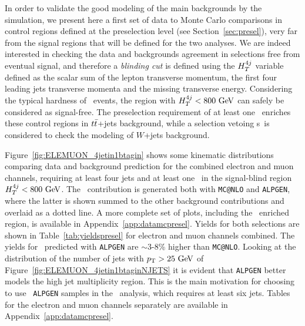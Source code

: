 
In order to validate the good modeling of the main backgrounds
by the simulation, we
present here a first set of data to Monte Carlo comparisons in
control regions defined at the preselection level 
(see Section~\ref{sec:presel}), very far from the
signal regions that will be defined for the two analyses. We
are indeed interested in checking the data and backgrounds agreement
in selections free from eventual signal, and therefore a {\it blinding cut}
is defined using the $\htfj$ variable defined as the scalar sum of the
lepton transverse momentum, the first four leading jets transverse momenta
and the missing transverse energy. Considering the typical hardness of
\TTbar\ events, the region with $\htfj<800\gev$ can
safely be considered as signal-free. 
The preselection requirement of at least one \bjet\ enriches these control
regions in $\ttbar$+jets background, while  a selection vetoing \bjet s\
is considered to check the modeling of $W$+jets background.

Figure~\ref{fig:ELEMUON_4jetin1btagin} shows some kinematic distributions
comparing data and background prediction 
for the combined electron and muon channels,
requiring at least four jets and at least one \bjet\ 
in the signal-blind region  $\htfj<800\gev$. The \ttbar\ contribution 
is generated both with \texttt{MC@NLO} and \texttt{ALPGEN}, where the latter
is shown summed to the other background contributions and overlaid
as a dotted line.
A more complete set of plots, including the  \wjets\ enriched region, is available 
in Appendix~\ref{app:datamcpresel}. Yields for 
both selections are shown in Table~\ref{tab:yieldspresel} for electron
and muon channels combined. The yields for \ttbar\ predicted with \texttt{ALPGEN}
are $\sim$3-8\% higher than \texttt{MC@NLO}.
Looking at the distribution of the number of jets with $\pt>25\gev$
of Figure~\ref{fig:ELEMUON_4jetin1btaginNJETS} it is
evident that \texttt{ALPGEN} better models the high jet multiplicity
region. This is the main motivation for choosing to use \ttbar\ \texttt{ALPGEN}
samples in the \htx\ analysis, which requires at least six jets.
Tables for the electron and muon channels separately are available in  Appendix~\ref{app:datamcpresel}.


